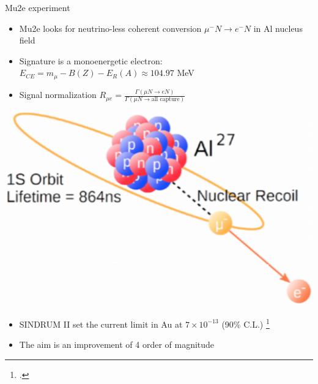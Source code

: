 \documentclass[10pt]{beamer}
\begin{document}
\begin{frame}{Mu2e experiment}
\begin{minipage}{.6\textwidth}
	\begin{itemize}
	\setlength\itemsep{0.4cm}
	\item Mu2e looks for neutrino-less coherent conversion
	$\mu^- N \rightarrow e^- N$ in Al nucleus field
	\item Signature is a monoenergetic electron:\\
 $E_{CE} = m_\mu -B(Z) -E_R(A) \approx 104.97$ MeV
	\item Signal normalization $R_{\mu e }=\frac{\Gamma(\mu N\rightarrow e N)}{\Gamma(\mu N\rightarrow \textrm{all capture})}$
	\end{itemize}
\end{minipage}
\begin{minipage}{0.35\textwidth}
    \centering
    \includegraphics[width=1\textwidth]{conversion_sketch}
\end{minipage}
\vspace{0.4cm}
\begin{itemize}
\setlength\itemsep{0.4cm}
\item SINDRUM II set the current limit in Au at $7\times10^{-13}$ (90\% C.L.) \footcite{SINDRUMII}
\item The aim is an improvement of 4 order of magnitude
\end{itemize}
\end{frame}
\end{document}

